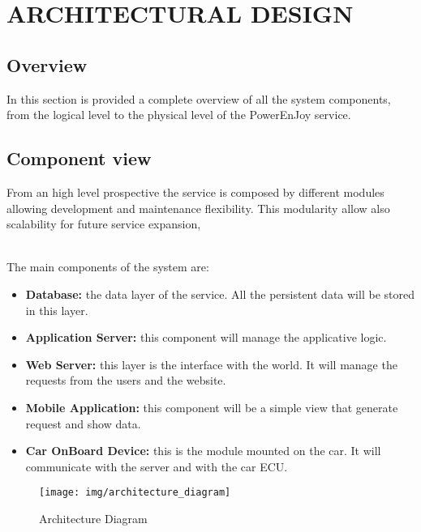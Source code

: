 \section{ARCHITECTURAL DESIGN}
\subsection{Overview} 
In this section is provided a complete overview of all the system components, from the logical level to the physical level of the PowerEnJoy service.


\subsection{Component view} 
From an high level prospective the service is composed by different modules allowing development and maintenance flexibility.
This modularity allow also scalability for future service expansion, 

\\The main components of the system are:
\begin{itemize}
\item{\textbf{Database:}} the data layer of the service. All the persistent data will be stored in this layer.
\item{\textbf{Application Server:}} this component will manage the applicative logic.
\item{\textbf{Web Server:}} this layer is the interface with the world. It will manage the requests from the users and the website.
\item{\textbf{Mobile Application:}} this component will be a simple view that generate request and show data. 
\item{\textbf{Car OnBoard Device:}} this is the module mounted on the car. It will communicate with the server and with the car ECU.
\end{itemize}

	\begin{figure}[H]	
	\centering
	\texttt{[image: img/architecture\_diagram]}
	\caption{Architecture Diagram}
\end{figure}






